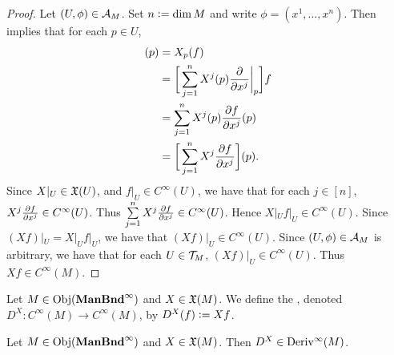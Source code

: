 \documentclass{book}
\begin{document}
\begin{proof}
	Let $(U, \phi) \in \mathcal{A}_M$. Set $n \vcentcolon= \dim M$ and write $\phi = (x^1, \ldots, x^n)$. Then  implies that for each $p \in U$,
	\begin{align*}
		[X|_U f|_U](p)
		& = X_p (f) \\
		& = \bigg[ \sum_{j=1}^n X^j(p) \frac{\p}{\p x^j} \bigg|_p  \bigg] f \\
		& = \sum_{j=1}^n X^j(p) \frac{\p f}{\p x^j}(p) \\
		& = \bigg[ \sum_{j=1}^n X^j \frac{\p f}{\p x^j}\bigg] (p).
	\end{align*}
	Since $X|_U \in \mathfrak{X}(U)$, and $f|_U \in C^{\infty}(U)$, we have that for each $j \in [n]$, $X^j \frac{\partial f}{\partial x^j} \in C^{\infty}(U)$. Thus $\sum\limits_{j=1}^n X^j \frac{\partial f}{\partial x^j} \in C^{\infty}(U)$. Hence $X|_U f|_U \in C^{\infty}(U)$. Since $(Xf)|_U = X|_U f|_U$, we have that $(Xf)|_U \in C^{\infty}(U)$. Since $(U, \phi) \in \mathcal{A}_M$ is arbitrary, we have that for each $U \in \mathcal{T}_M$, $(Xf)|_U \in C^{\infty}(U)$. Thus $Xf \in C^{\infty}(M)$. 
\end{proof}

\begin{defn}
	Let $M \in \operatorname{Obj}(\operatorname*{\text{\textbf{ManBnd}}^{\infty}})$ and $X \in \mathfrak{X}(M)$. We define the , denoted $D^X: C^{\infty}(M) \rightarrow C^{\infty}(M)$, by $D^X(f) \vcentcolon= Xf$.
\end{defn}

\begin{ex}
	Let $M \in \operatorname{Obj}(\operatorname*{\text{\textbf{ManBnd}}^{\infty}})$ and $X \in \mathfrak{X}(M)$. Then $D^X \in \operatorname{Deriv^{\infty}}(M)$.
\end{ex}
\end{document}
